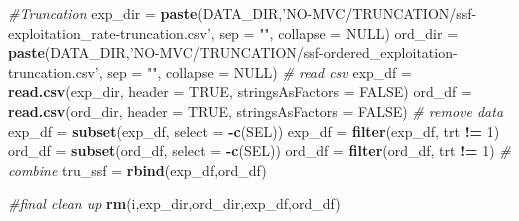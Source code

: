 \documentclass[]{book}
\newenvironment{Shaded}{\begin{snugshade}}{\end{snugshade}}
\newcommand{\CommentTok}[1]{\textcolor[rgb]{0.56,0.35,0.01}{\textit{#1}}}
\newcommand{\DataTypeTok}[1]{\textcolor[rgb]{0.13,0.29,0.53}{#1}}
\newcommand{\DecValTok}[1]{\textcolor[rgb]{0.00,0.00,0.81}{#1}}
\newcommand{\KeywordTok}[1]{\textcolor[rgb]{0.13,0.29,0.53}{\textbf{#1}}}
\newcommand{\NormalTok}[1]{#1}
\newcommand{\OperatorTok}[1]{\textcolor[rgb]{0.81,0.36,0.00}{\textbf{#1}}}
\newcommand{\OtherTok}[1]{\textcolor[rgb]{0.56,0.35,0.01}{#1}}
\newcommand{\StringTok}[1]{\textcolor[rgb]{0.31,0.60,0.02}{#1}}
\begin{document}
\begin{Shaded}
\begin{Highlighting}[]
\CommentTok{#Truncation}
\NormalTok{exp_dir =}\StringTok{ }\KeywordTok{paste}\NormalTok{(DATA_DIR,}\StringTok{'NO-MVC/TRUNCATION/ssf-exploitation_rate-truncation.csv'}\NormalTok{, }\DataTypeTok{sep =} \StringTok{""}\NormalTok{, }\DataTypeTok{collapse =} \OtherTok{NULL}\NormalTok{)}
\NormalTok{ord_dir =}\StringTok{ }\KeywordTok{paste}\NormalTok{(DATA_DIR,}\StringTok{'NO-MVC/TRUNCATION/ssf-ordered_exploitation-truncation.csv'}\NormalTok{, }\DataTypeTok{sep =} \StringTok{""}\NormalTok{, }\DataTypeTok{collapse =} \OtherTok{NULL}\NormalTok{)}
\CommentTok{# read csv}
\NormalTok{exp_df =}\StringTok{ }\KeywordTok{read.csv}\NormalTok{(exp_dir, }\DataTypeTok{header =} \OtherTok{TRUE}\NormalTok{, }\DataTypeTok{stringsAsFactors =} \OtherTok{FALSE}\NormalTok{)}
\NormalTok{ord_df =}\StringTok{ }\KeywordTok{read.csv}\NormalTok{(ord_dir, }\DataTypeTok{header =} \OtherTok{TRUE}\NormalTok{, }\DataTypeTok{stringsAsFactors =} \OtherTok{FALSE}\NormalTok{)}
\CommentTok{# remove data}
\NormalTok{exp_df =}\StringTok{ }\KeywordTok{subset}\NormalTok{(exp_df, }\DataTypeTok{select =} \OperatorTok{-}\KeywordTok{c}\NormalTok{(SEL))}
\NormalTok{exp_df =}\StringTok{ }\KeywordTok{filter}\NormalTok{(exp_df, trt }\OperatorTok{!=}\StringTok{ }\DecValTok{1}\NormalTok{)}
\NormalTok{ord_df =}\StringTok{ }\KeywordTok{subset}\NormalTok{(ord_df, }\DataTypeTok{select =} \OperatorTok{-}\KeywordTok{c}\NormalTok{(SEL))}
\NormalTok{ord_df =}\StringTok{ }\KeywordTok{filter}\NormalTok{(ord_df, trt }\OperatorTok{!=}\StringTok{ }\DecValTok{1}\NormalTok{)}
\CommentTok{# combine}
\NormalTok{tru_ssf =}\StringTok{ }\KeywordTok{rbind}\NormalTok{(exp_df,ord_df)}

\CommentTok{#final clean up}
\KeywordTok{rm}\NormalTok{(i,exp_dir,ord_dir,exp_df,ord_df)}
\end{Highlighting}
\end{Shaded}


\end{document}
